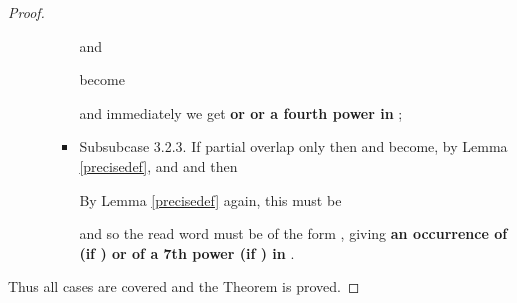 \documentclass[12pt]{article}
\theoremstyle{plain}
\theoremstyle{definition}
\theoremstyle{remark}
\begin{document}
\begin{proof}
\begin{itemize}
\begin{itemize}
\begin{itemize}
								and
								
								become
								
								and
								immediately we get \textbf{ or  or a fourth power in };
							\item{} Subsubcase 3.2.3.
								If partial overlap only then  and  become,
								by Lemma \ref{precisedef},
								 and  and then
								
								By Lemma \ref{precisedef} again, this must be
								
								and so the read word must be of the form ,
								giving \textbf{an occurrence of  (if ) or of a 7th power (if ) in }.
						\end{itemize}
					\end{itemize}
				\end{itemize}
				Thus all cases are covered and the Theorem is proved.
			\end{proof}
\end{document}
